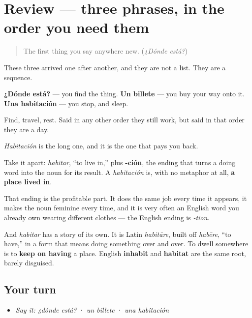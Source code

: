 \section[(review)]{Review — three phrases, in the order you need them}

\label{lesson:ES-C268-repaso-llegar-y-quedarse}



\begin{quote}
The first thing you say anywhere new. (\emph{¿Dónde está?})
\end{quote}

\begin{grammarlens}[title={What you've built}]
These three arrived one after another, and they are not a list. They are a sequence.

\textbf{¿Dónde está?} — you find the thing. \textbf{Un billete} — you buy your way onto it. \textbf{Una habitación} — you stop, and sleep.

Find, travel, rest. Said in any other order they still work, but said in that order they are a day.
\end{grammarlens}

\begin{culture}
\emph{Habitación} is the long one, and it is the one that pays you back.

Take it apart: \emph{habitar}, \textquotedblleft{}to live in,\textquotedblright{} plus \textbf{-ción}, the ending that turns a doing word into the noun for its result. A \emph{habitación} is, with no metaphor at all, \textbf{a place lived in}.

That ending is the profitable part. It does the same job every time it appears, it makes the noun feminine every time, and it is very often an English word you already own wearing different clothes — the English ending is \emph{-tion}.

And \emph{habitar} has a story of its own. It is Latin \emph{habitāre}, built off \emph{habēre}, \textquotedblleft{}to have,\textquotedblright{} in a form that means doing something over and over. To dwell somewhere is to \textbf{keep on having} a place. English \textbf{inhabit} and \textbf{habitat} are the same root, barely disguised.
\end{culture}

\subsection*{Your turn}
\begin{itemize}
\raggedright
  \item \emph{Say it:} \emph{¿dónde está?} · \emph{un billete} · \emph{una habitación}
\end{itemize}

